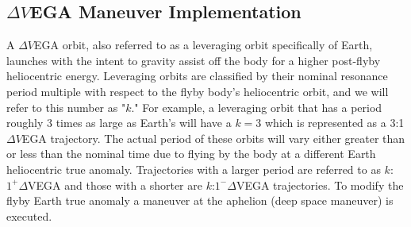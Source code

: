 \documentclass[letterpaper, paper,11pt]{./AAS}		%
\begin{document}
\subsection{$\Delta V$EGA Maneuver Implementation}
A $\Delta V$EGA orbit, also referred to as a leveraging orbit specifically of Earth, launches with the intent to gravity assist off the body for a higher post-flyby heliocentric energy\cite{Hollenbeck}.  Leveraging orbits are classified by their nominal resonance period multiple with respect to the flyby body's heliocentric orbit, and we will refer to this number as "$k$." For example, a leveraging orbit that has a period roughly 3 times as large as Earth's will have a $k=3$ which is represented as a 3:1 $\Delta V$EGA trajectory. The actual period of these orbits will vary either greater than or less than the nominal time due to flying by the body at a different Earth heliocentric true anomaly. Trajectories with a larger period are referred to as $k$:$1^{+} \Delta$VEGA and those with a shorter are $k$:$1^{-} \Delta$VEGA trajectories. To modify the flyby Earth true anomaly a maneuver at the aphelion (deep space maneuver) is executed.
\end{document}
